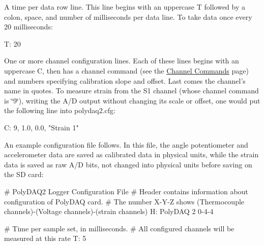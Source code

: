 \begin{DoxyItemize}
\item A time per data row line. This line begins with an uppercase {\ttfamily T} followed by a colon, space, and number of milliseconds per data line. To take data once every 20 milliseconds\-: 
\begin{DoxyCode}
T: 20
\end{DoxyCode}

\item One or more channel configuration lines. Each of these lines begins with an uppercase {\ttfamily C}, then has a channel command (see the \hyperlink{pd_channels}{Channel Commands} page) and numbers specifying calibration slope and offset. Last comes the channel's name in quotes. To measure strain from the {\ttfamily S1} channel (whose channel command is \char`\"{}9\char`\"{}), writing the A/\-D output without changing its scale or offset, one would put the following line into {\ttfamily polydaq2.\-cfg\-:} 
\begin{DoxyCode}
C: 9, 1.0, 0.0, \textcolor{stringliteral}{"Strain 1"}
\end{DoxyCode}
 An example configuration file follows. In this file, the angle potentiometer and accelerometer data are saved as calibrated data in physical units, while the strain data is saved as raw A/\-D bits, not changed into physical units before saving on the S\-D card\-: 
\begin{DoxyCode}
\textcolor{preprocessor}{# PolyDAQ2 Logger Configuration File}
\textcolor{preprocessor}{}\textcolor{preprocessor}{# Header contains information about configuration of PolyDAQ card.}
\textcolor{preprocessor}{}\textcolor{preprocessor}{# The number X-Y-Z shows (Thermocouple channels)-(Voltage channels)-(strain channels)}
\textcolor{preprocessor}{}
H: PolyDAQ 2 0-4-4

\textcolor{preprocessor}{# Time per sample set, in milliseconds.}
\textcolor{preprocessor}{}\textcolor{preprocessor}{# All configured channels will be measured at this rate}
\textcolor{preprocessor}{}
T: 5


\end{DoxyCode}
\end{DoxyItemize}

